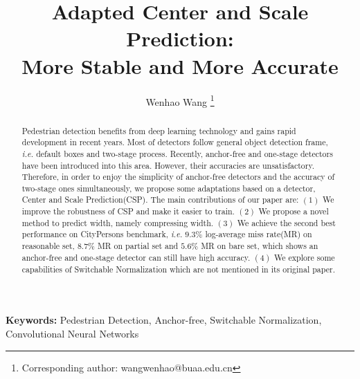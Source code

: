 \documentclass[twocolumn]{article}
\title{Adapted Center and Scale Prediction: \\More Stable and More Accurate}
\author[1]{Wenhao Wang \thanks{Corresponding author: wangwenhao@buaa.edu.cn}}
\affil[1]{School of Mathematical Sciences(SMS), Beihang University, Beijing, China}
\date{}
\providecommand{\keywords}[1]{\textbf{Keywords:} #1}
\begin{document}

\maketitle
\begin{abstract}
Pedestrian detection benefits from deep learning technology and gains rapid development in recent years. Most of detectors follow general object detection frame, \textit{i.e.} default boxes and two-stage process. Recently, anchor-free and one-stage detectors have been introduced into this area. However, their accuracies are unsatisfactory. Therefore, in order to enjoy the simplicity of anchor-free detectors and the accuracy of two-stage ones simultaneously, we propose some adaptations based on a detector, Center and Scale Prediction(CSP). The main contributions of our paper are: $(1)$ We improve the robustness of CSP and make it easier to train. $(2)$ We propose a novel method to predict width, namely compressing width. $(3)$ We achieve the second best performance  on CityPersons benchmark, \textit{i.e.} $9.3\%$ log-average miss rate(MR) on reasonable set, $8.7\%$ MR on partial set and $5.6\%$ MR on bare set, which shows an anchor-free and one-stage detector can still have high accuracy. $(4)$ We explore some capabilities of Switchable Normalization which are not mentioned in its original paper.
\end{abstract}

\keywords{Pedestrian Detection, Anchor-free, Switchable Normalization, Convolutional Neural Networks}
\end{document}
